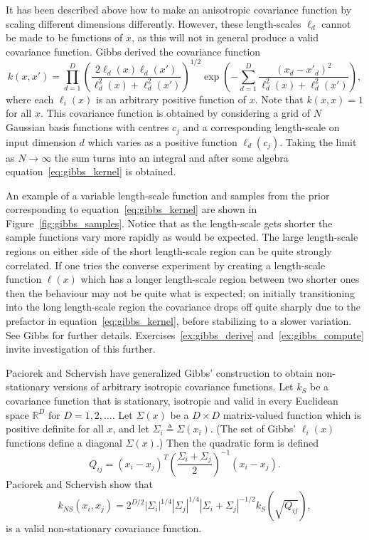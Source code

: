 \documentclass[11pt]{book}
\begin{document}
It has been described above how to make an anisotropic covariance function by scaling different dimensions differently. However, these length-scales $\ell_d$ cannot be made to be functions of $x$, as this will not in general produce a valid covariance function. Gibbs \cite{gibbs1997} derived the covariance function
\begin{equation}
\label{eq:gibbs_kernel}
k(x, x') = \prod_{d=1}^D \left(\frac{2\ell_d(x)\ell_d(x')}{\ell_d^2(x) + \ell_d^2(x')}\right)^{1/2} \exp\left(-\sum_{d=1}^D \frac{(x_d - x'_d)^2}{\ell_d^2(x) + \ell_d^2(x')}\right),
\end{equation}
where each $\ell_i(x)$ is an arbitrary positive function of $x$. Note that $k(x, x) = 1$ for all $x$. This covariance function is obtained by considering a grid of $N$ Gaussian basis functions with centres $c_j$ and a corresponding length-scale on input dimension $d$ which varies as a positive function $\ell_d(c_j)$. Taking the limit as $N \to \infty$ the sum turns into an integral and after some algebra equation~\eqref{eq:gibbs_kernel} is obtained.

An example of a variable length-scale function and samples from the prior corresponding to equation~\eqref{eq:gibbs_kernel} are shown in Figure~\ref{fig:gibbs_samples}. Notice that as the length-scale gets shorter the sample functions vary more rapidly as would be expected. The large length-scale regions on either side of the short length-scale region can be quite strongly correlated. If one tries the converse experiment by creating a length-scale function $\ell(x)$ which has a longer length-scale region between two shorter ones then the behaviour may not be quite what is expected; on initially transitioning into the long length-scale region the covariance drops off quite sharply due to the prefactor in equation~\eqref{eq:gibbs_kernel}, before stabilizing to a slower variation. See Gibbs \cite{gibbs1997} for further details. Exercises~\ref{ex:gibbs_derive} and~\ref{ex:gibbs_compute} invite investigation of this further.

Paciorek and Schervish \cite{paciorek2004} have generalized Gibbs' construction to obtain non-stationary versions of arbitrary isotropic covariance functions. Let $k_S$ be a covariance function that is stationary, isotropic and valid in every Euclidean space $\mathbb{R}^D$ for $D = 1, 2, \ldots$. Let $\Sigma(x)$ be a $D \times D$ matrix-valued function which is positive definite for all $x$, and let $\Sigma_i \triangleq \Sigma(x_i)$. (The set of Gibbs' $\ell_i(x)$ functions define a diagonal $\Sigma(x)$.) Then the quadratic form is defined
\begin{equation}
\label{eq:paciorek_quadratic}
Q_{ij} = (x_i - x_j)^T \left(\frac{\Sigma_i + \Sigma_j}{2}\right)^{-1} (x_i - x_j).
\end{equation}
Paciorek and Schervish \cite{paciorek2004} show that
\begin{equation}
\label{eq:paciorek_kernel}
k_{NS}(x_i, x_j) = 2^{D/2} |\Sigma_i|^{1/4} |\Sigma_j|^{1/4} |\Sigma_i + \Sigma_j|^{-1/2} k_S(\sqrt{Q_{ij}}),
\end{equation}
is a valid non-stationary covariance function.
\end{document}
